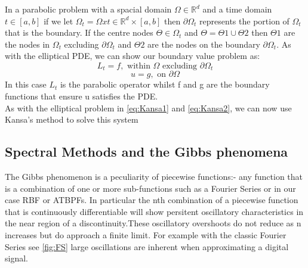 \documentclass[a4paper]{amsart}
\begin{document}
In a parabolic problem with a spacial domain $\Omega \in \mathbb{R}^{d}$ and a time domain $t \in [a,b]$ if we let $\Omega_{t} = \Omega x t \in \mathbb{R}^{d} \times [a,b]$ then $\partial \Omega_{t}$ represents the portion of $\Omega_{t}$ that is the boundary.
If the centre nodes $\Theta \in \Omega_{t}$ and $\Theta = \Theta1 \cup \Theta2$ then $\Theta1$ are the nodes in $\Omega_{t}$ excluding $\partial \Omega_{t}$ and $\Theta2$ are the nodes on the boundary $\partial \Omega_{t}$. As with the elliptical PDE, we can show our boundary value problem as:
\begin{equation}
L_{t} = f, \mbox{ within } \Omega \mbox{ excluding } \partial \Omega_{t}
\end{equation}
\begin{equation}
u = g, \mbox{ on } \partial \Omega
\end{equation}
In this case $L_{t}$ is the parabolic operator whilst f and g are the boundary functions that ensure u satisfies the PDE.\\

As with the elliptical problem in \ref{eq:Kansa1} and \ref{eq:Kansa2}, we can now use Kansa's method to solve this system


\subsection{Spectral Methods and the Gibbs phenomena}

The Gibbs phenomenon is a peculiarity of piecewise functions:- any function that is a combination of one or more sub-functions such as a Fourier Series or in our case RBF or ATBPFs. In particular the nth combination of a piecewise function that is continuously differentiable will show persitent oscillatory characteristics in the near region of a discontinuity.These oscillatory overshoots do not reduce as n increases but do approach a finite limit. For example with the classic Fourier Series see \ref{fig:FS} large oscillations are inherent when approximating a digital signal.\\
\end{document}
